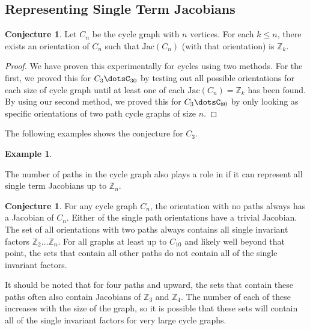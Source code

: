 \documentclass[11pt,reqno]{amsart}
\newcommand{\Jac}{\textrm{Jac}}{}
\theoremstyle{definition}
\newtheorem{myeg}[mydef]{\textbf{Example}}
\newtheorem{conj}[mydef]{\textbf{Conjecture}}
\theoremstyle{plain}
\begin{document}
	\subsection{Representing Single Term Jacobians}
		\begin{conj}
			Let $C_n$ be the cycle graph with $n$ vertices. For each $k \leq n$, there exists an orientation of $C_n$
			such that $\Jac(C_n)$ (with that orientation) is $\mathbb{Z}_k$.
		\end{conj}
		\begin{proof}
			We have proven this experimentally for cycles using two methods.  For the first, we proved this for
			$C_3\dotsC_{30}$ by testing out all possible orientations for each size of cycle graph until at least one
			of each $\Jac(C_n)=\mathbb{Z}_k$ has been found.  By using our second method, we proved this for
			$C_3\dotsC_{80}$ by only looking as specific orientations of two path cycle graphs of size $n$.
		\end{proof}

		The following examples shows the conjecture for $C_3$.

		\begin{myeg}


		\end{myeg}

		The number of paths in the cycle graph also plays a role in if it can represent all single term Jacobians up
		to $\mathbb{Z}_n$.

		\begin{conj}
			For any cycle graph $C_n$, the orientation with no paths always has a Jacobian of $C_n$.
			Either of the single path orientations have a trivial Jacobian.
			The set of all orientations with two paths always contains all single invariant factors
			$\mathbb{Z}_2\dots\mathbb{Z}_n$.  For all graphs at least up to $C_{10}$ and likely well beyond that
			point, the sets that contain all other paths do not contain all of the single invariant factors.
		\end{conj}

		It should be noted that for four paths and upward, the sets that contain these paths often also contain
		Jacobians of $\mathbb{Z}_3$ and $\mathbb{Z}_4$.  The number of each of these increases with the size of the
		graph, so it is possible that these sets will contain all of the single invariant factors for very
		large cycle graphs.
\end{document}
